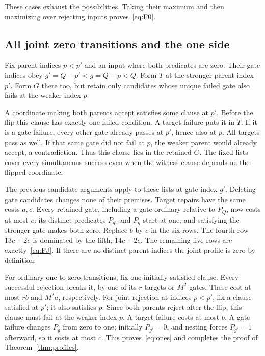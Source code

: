 \documentclass[11pt]{amsart}
\theoremstyle{definition}
\theoremstyle{remark}
\begin{document}
These cases exhaust the possibilities. Taking their maximum and then
maximizing over rejecting inputs proves~\eqref{eq:F0}.

\subsection{All joint zero transitions and the one side}
Fix parent indices $p<p'$ and an input where both predicates are zero.
Their gate indices obey $g'=Q-p'<g=Q-p<Q$.
Form $T$ at the stronger parent index $p'$. Form $G$ there too, but
retain only candidates whose unique failed gate also fails at the
weaker index $p$.

A coordinate making both parents accept satisfies some clause at $p'$.
Before the flip this clause has exactly one failed condition. A target
failure puts it in $T$. If it is a gate failure, every other gate
already passes at $p'$, hence also at $p$. All targets pass as well.
If that same gate did not fail at $p$, the weaker parent would already
accept, a contradiction. Thus this clause lies in the retained $G$.
The fixed lists cover every simultaneous success even when the witness
clause depends on the flipped coordinate.

The previous candidate arguments apply to these lists at gate index
$g'$. Deleting gate candidates changes none of their premises. Target
repairs have the same costs $a,c$. Every retained gate, including a
gate ordinary relative to $P_Q$, now costs at most $e$: its distinct
predicates $P_{g'}$ and $P_g$ start at one, and satisfying the stronger
gate makes both zero. Replace $b$ by $e$ in the six rows. The fourth
row $13c+2e$ is dominated by the fifth, $14c+2e$. The remaining five
rows are exactly~\eqref{eq:FJ}. If there are no distinct parent
indices the joint profile is zero by definition.

For ordinary one-to-zero transitions, fix one initially satisfied
clause. Every successful rejection breaks it, by one of its $r$ targets
or $M^2$ gates. These cost at most $rb$ and $M^2a$, respectively.
For joint rejection at indices $p<p'$, fix a clause satisfied at $p'$;
it also satisfies $p$. Since both parents reject after the flip, this
clause must fail at the weaker index $p$. A target failure costs at
most $b$. A gate failure changes $P_g$ from zero to one; initially
$P_{g'}=0$, and nesting forces $P_{g'}=1$ afterward, so it costs at
most $c$. This proves~\eqref{eq:ones} and completes the proof of
Theorem~\ref{thm:profiles}.
\end{document}

